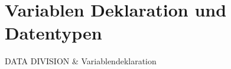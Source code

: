 \section{Variablen Deklaration und Datentypen} \label{variables}
DATA DIVISION \& Variablendeklaration
